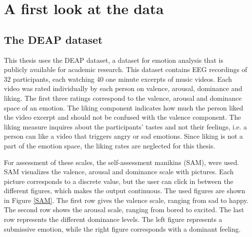 \chapter{A first look at the data}
{\samenvatting }

\section{The DEAP dataset}
This thesis uses the DEAP dataset\cite{DEAP}, a dataset for emotion analysis that is publicly available for academic research. This dataset contains EEG recordings of 32 participants, each watching 40 one minute excerpts of music videos. Each video was rated individually by each person on valence, arousal, dominance and liking. The first three ratings correspond to the valence, arousal and dominance space of an emotion. The liking component indicates how much the person liked the video excerpt and should not be confused with the valence component. The liking measure inquires about the participants' tastes and not their feelings, i.e. a person can like a video that triggers angry or sad emotions. Since liking is not a part of the emotion space, the liking rates are neglected for this thesis.

\npar

For assessment of these scales, the self-assessment manikins (SAM), were used\cite{DEAP}. SAM visualizes the valence, arousal and dominance scale with pictures. Each picture corresponds to a discrete value, but the user can click in between the different figures, which makes the output continuous. The used figures are shown in Figure \ref{SAM}. The first row gives the valence scale, ranging from sad to happy. The second row shows the arousal scale, ranging from bored to excited. The last row represents the different dominance levels. The left figure represents a submissive emotion, while the right figure corresponds with a dominant feeling.


